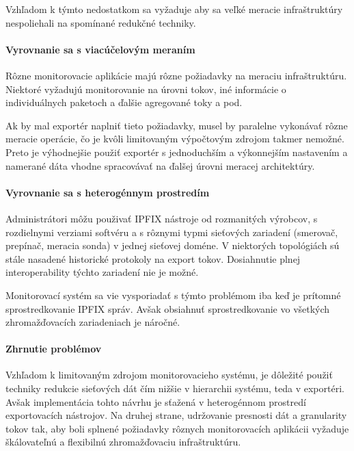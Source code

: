 Vzhľadom k týmto nedostatkom sa vyžaduje aby sa veľké meracie infraštruktúry nespoliehali na 
spomínané redukčné techniky.

\paragraph{Vyrovnanie sa s viacúčelovým meraním}

Rôzne monitorovacie aplikácie majú rôzne požiadavky na meraciu infraštruktúru. Niektoré vyžadujú 
monitorovanie na úrovni tokov, iné informácie o individuálnych paketoch a ďalšie agregované toky a pod.

Ak by mal exportér naplniť tieto požiadavky, musel by paralelne vykonávať rôzne meracie operácie, čo je
kvôli limitovaným výpočtovým zdrojom takmer nemožné. Preto je výhodnejšie použiť exportér s jednoduchším a 
výkonnejším nastavením a namerané dáta vhodne spracovávať na ďalšej úrovni meracej architektúry.


\paragraph{Vyrovnanie sa s heterogénnym prostredím}

Administrátori môžu použivať IPFIX nástroje od rozmanitých výrobcov, s rozdielnymi verziami softvéru a s 
rôznymi typmi sieťových zariadení (smerovač, prepínač, meracia sonda) v jednej sieťovej doméne.
V niektorých topológiách sú stále nasadené historické protokoly na export tokov. Dosiahnutie plnej 
interoperability týchto zariadení nie je možné.

Monitorovací systém sa vie vysporiadať s týmto problémom iba keď je prítomné sprostredkovanie IPFIX správ.
Avšak obsiahnuť sprostredkovanie vo všetkých zhromažďovacích zariadeniach je náročné.

\paragraph{Zhrnutie problémov}

Vzhľadom k limitovaným zdrojom monitorovacieho systému, je dôležité použiť techniky redukcie sieťových 
dát čím nižšie v hierarchii systému, teda v exportéri. Avšak implementácia tohto návrhu je sťažená v 
heterogénnom prostredí exportovacích nástrojov. 
Na druhej strane, udržovanie presnosti dát a granularity tokov tak, aby boli splnené požiadavky 
rôznych monitorovacích aplikácii vyžaduje škálovateľnú a flexibilnú zhromažďovaciu infraštruktúru.

